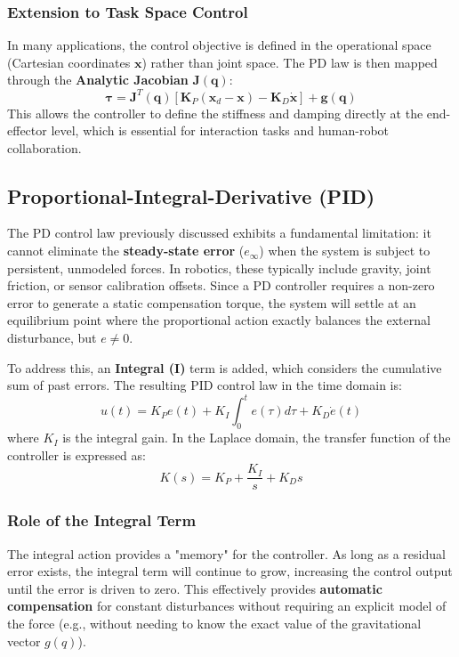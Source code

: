 \subsubsection{Extension to Task Space Control}
In many applications, the control objective is defined in the operational space (Cartesian coordinates $\bm{x}$) rather than joint space. 
The PD law is then mapped through the \textbf{Analytic Jacobian} $\bm{J}(\bm{q})$:
\begin{equation}
    \bm{\tau} = \bm{J}^T(\bm{q}) \left[ \bm{K}_P (\bm{x}_d - \bm{x}) - \bm{K}_D \dot{\bm{x}} \right] + \bm{g}(\bm{q})
\end{equation}
This allows the controller to define the stiffness and damping directly at the end-effector level, which is essential for interaction tasks and human-robot collaboration.


\subsection{Proportional-Integral-Derivative (PID)}
\label{subsec:pid_control}

The PD control law previously discussed exhibits a fundamental limitation: it cannot eliminate the \textbf{steady-state error} 
($e_{\infty}$) when the system is subject to persistent, unmodeled forces. In robotics, these typically include gravity, joint friction,
or sensor calibration offsets. Since a PD controller requires a non-zero error to generate a static compensation torque, the system will settle at 
an equilibrium point where the proportional action exactly balances the external disturbance, but $e \neq 0$.

To address this, an \textbf{Integral (I)} term is added, which considers the cumulative sum of past errors. The resulting PID control law in the time domain is:
\begin{equation}
    u(t) = K_P e(t) + K_I \int_{0}^{t} e(\tau) d\tau + K_D \dot{e}(t)
\end{equation}
where $K_I$ is the integral gain. In the Laplace domain, the transfer function of the controller is expressed as:
\begin{equation}
    K(s) = K_P + \frac{K_I}{s} + K_D s
\end{equation}

\subsubsection{Role of the Integral Term}
The integral action provides a "memory" for the controller. As long as a residual error exists, the integral term will continue to grow, 
increasing the control output until the error is driven to zero. This effectively provides \textbf{automatic compensation} for constant disturbances 
without requiring an explicit model of the force (e.g., without needing to know the exact value of the gravitational vector $g(q)$).

